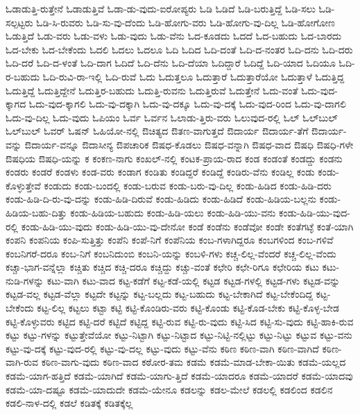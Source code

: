 {ಓಡಾಡುತ್ತಿ-ರುತ್ತೇನೆ
ಓಡಾಡುತ್ತಿವೆ
ಓಡಾ-ಡು-ವುದು-ಐರೋಪ್ಯರು
ಓಡಿ
ಓಡಿದೆ
ಓಡಿ-ಬರುತ್ತಿದ್ದೆ
ಓಡಿ-ಸಲು
ಓಡಿ-ಸಲ್ಪಟ್ಟರು
ಓಡಿ-ಸಿ-ರುವರು
ಓಡಿ-ಸು-ವು-ದೆಂದು
ಓಡಿ-ಹೋಗು-ವರು
ಓಡಿ-ಹೋಗು-ವು-ದಿಲ್ಲ
ಓಡಿ-ಹೋಗೋಣ
ಓಡುತ್ತಿದೆ
ಓಡು-ವರು
ಓಡು-ವಳು
ಓಡು-ವುದು
ಓಡು-ವೆನು
ಓದ-ಕೂಡದು
ಓದದೆ
ಓದ-ಬಹುದು
ಓದ-ಬಾರದು
ಓದ-ಬೇಕು
ಓದ-ಬೇಕೆಂದು
ಓದಲಿ
ಓದಲು
ಓದಲೂ
ಓದಿ
ಓದಿದ
ಓದಿ-ದಂತೆ
ಓದಿ-ದ-ನಂತರ
ಓದಿ-ದನು
ಓದಿ-ದರು
ಓದಿ-ದರೆ
ಓದಿ-ದ-ಳಂತೆ
ಓದಿ-ದಾಗ
ಓದಿದೆ
ಓದಿ-ದೆನು
ಓದಿ-ದೆಯಾ
ಓದಿದ್ದಾರೆ
ಓದಿದ್ದೆ
ಓದಿ-ಯಾದ
ಓದಿಯೂ
ಓದಿ-ರ-ಬಹುದು
ಓದಿ-ರುವಿ-ರಾ-ಇಲ್ಲಿ
ಓದಿ-ರುವೆ
ಓದು
ಓದುತ್ತಲೂ
ಓದುತ್ತಾರೆ
ಓದುತ್ತಾರೆಯೋ
ಓದುತ್ತಾಳೆ
ಓದುತ್ತಿದ್ದ
ಓದುತ್ತಿದ್ದೆ
ಓದುತ್ತಿದ್ದೇನೆ
ಓದುತ್ತಿರ-ಬಹುದು
ಓದುತ್ತಿ-ರುವನು
ಓದುತ್ತಿರುವೆ
ಓದುತ್ತೇನೆ
ಓದು-ವಂತೆ
ಓದು-ವುದ-ಕ್ಕಾಗದ
ಓದು-ವುದ-ಕ್ಕಾಗಲಿ
ಓದು-ವು-ದಕ್ಕಾಗಿ
ಓದು-ವು-ದಕ್ಕೂ
ಓದು-ವು-ದಕ್ಕೆ
ಓದು-ವುದ-ರಿಂದ
ಓದು-ವು-ದಾಗಲಿ
ಓದು-ವು-ದಿಲ್ಲ
ಓದು-ವುದು
ಓಪಿಯಂ
ಓರ್ವ
ಓರ್ವನ
ಓಲಾಡು-ತ್ತಿರು-ವರು
ಓಲುವುದ-ರಲ್ಲಿ
ಓಲ್
ಓಲ್‌ಬುಲ್
ಓಲ್‌ಬುಲ್‌
ಓವರ್
ಓಷನ್
ಓಹಿಯೋ-ನಲ್ಲಿ
ಔಚಿತ್ಯದ
ಔತಣ-ವಾಗುತ್ತದೆ
ಔದಾರ್ಯ
ಔದಾರ್ಯ-ತೆಗೆ
ಔದಾರ್ಯ-ವನ್ನು
ಔದಾರ್ಯ-ವನ್ನೂ
ಔದಾಸೀನ್ಯ
ಔಪಚಾರಿಕ
ಔಷಧ-ಕೊಡಲು
ಔಷಧ-ವನ್ನಾಗಿ
ಔಷಧ-ವಾದ
ಔಷಧಿ
ಔಷಧಿ-ಗಳೇ
ಔಷಧಿಯ
ಔಷಧಿ-ಯನ್ನು
ಕ
ಕಂಕಣ-ನಾಗು
ಕಂಖಲ್‌-ನಲ್ಲಿ
ಕಂಟಕ-ಪ್ರಾಯ-ರಾದ
ಕಂಡ
ಕಂಡಂತೆ
ಕಂಡದ್ದು
ಕಂಡನು
ಕಂಡರು
ಕಂಡರೆ
ಕಂಡಳು
ಕಂಡ-ವರು
ಕಂಡಾಗ
ಕಂಡಿತು
ಕಂಡಿದ್ದರೆ
ಕಂಡಿದ್ದೆ
ಕಂಡಿರು-ವೆನು
ಕಂಡಿಲ್ಲ
ಕಂಡು
ಕಂಡು-ಕೊಳ್ಳುತ್ತೇವೆ
ಕಂಡುದು
ಕಂಡು-ಬಂದಲ್ಲಿ
ಕಂಡು-ಬರುವ
ಕಂಡು-ಬರು-ವು-ದಿಲ್ಲ
ಕಂಡು-ಹಿಡಿದ
ಕಂಡು-ಹಿಡಿ-ದರು
ಕಂಡು-ಹಿಡಿ-ದಿ-ರು-ವು-ದನ್ನು
ಕಂಡು-ಹಿಡಿ-ದಿರುವೆ
ಕಂಡು-ಹಿಡಿದು
ಕಂಡು-ಹಿಡಿದೆ
ಕಂಡು-ಹಿಡಿಯ-ಬಲ್ಲನು
ಕಂಡು-ಹಿಡಿಯ-ಬಹು-ದಿತ್ತು
ಕಂಡು-ಹಿಡಿಯ-ಬಹುದು
ಕಂಡು-ಹಿಡಿ-ಯಲು
ಕಂಡು-ಹಿಡಿ-ಯು-ವನು
ಕಂಡು-ಹಿಡಿ-ಯು-ವುದ-ರಲ್ಲಿ
ಕಂಡು-ಹಿಡಿ-ಯು-ವುದು
ಕಂಡು-ಹಿಡಿ-ಯು-ವು-ದೇನೋ
ಕಂಡೆ
ಕಂಡೆನು
ಕಂಡೆವೋ
ಕಂಡೇ
ಕಂತೆಗಟ್ಳೆ
ಕಂತೆ-ಯಾಗಿ
ಕಂಪನಿ
ಕಂಪನಿಯ
ಕಂಪಿ-ಸುತ್ತಿತ್ತು
ಕಂಪೆನಿ
ಕಂಪೆ-ನಿಗೆ
ಕಂಪೆನಿಯ
ಕಂಬ-ಗಳಾಗಿದ್ದರೂ
ಕಂಬಗಳಿಂದ
ಕಂಬ-ಗಳಿವೆ
ಕಂಬನಿಗರೆ-ದರೂ
ಕಂಬ-ನಿಗೆ
ಕಂಬನಿದುಂಬಿ
ಕಂಬನಿ-ಯನ್ನು
ಕಂಬಳಿ-ಗಳು
ಕಚ್ಚ-ಲಿಲ್ಲ-ವೆಂದರೆ
ಕಚ್ಚ-ಲಿಲ್ಲ-ವೆಂದು
ಕಚ್ಚಾ-ಭಾಗ-ವನ್ನೆಲ್ಲಾ
ಕಚ್ಚಿತು
ಕಚ್ಚಿದ
ಕಚ್ಚಿ-ದರೂ
ಕಚ್ಚಿದ್ದು
ಕಚ್ಚು-ವಂತೆ
ಕಛೇರಿ
ಕಛೇ-ರಿಗೂ
ಕಛೇರಿಯ
ಕಟು
ಕಟು-ನುಡಿ-ಗಳನ್ನು
ಕಟು-ವಾಗಿ
ಕಟು-ವಾದ
ಕಟ್ಟ-ಕಡೆಗೆ
ಕಟ್ಟ-ಕಡೆ-ಯಲ್ಲಿ
ಕಟ್ಟಡ
ಕಟ್ಟಡ-ಗಳಲ್ಲಿ
ಕಟ್ಟಡ-ಗಳು
ಕಟ್ಟಡ-ವನ್ನು
ಕಟ್ಟಡ-ವಲ್ಲ
ಕಟ್ಟಡ-ವೆಲ್ಲಾ
ಕಟ್ಟದೇ
ಕಟ್ಟನ್ನು
ಕಟ್ಟ-ಬಲ್ಲದು
ಕಟ್ಟ-ಬಹುದು
ಕಟ್ಟ-ಬೇಕಾಗಿದೆ
ಕಟ್ಟ-ಬೇಕೆಂದಿದ್ದ
ಕಟ್ಟ-ಬೇಕೆಂದು
ಕಟ್ಟ-ಲಿಲ್ಲ
ಕಟ್ಟಲು
ಕಟ್ಟಾ
ಕಟ್ಟಿ
ಕಟ್ಟಿ-ಕೊಂಡಿರು-ವರು
ಕಟ್ಟಿ-ಕೊಂಡು
ಕಟ್ಟಿ-ಕೊಡ-ಬೇಕು
ಕಟ್ಟಿ-ಕೊಳ್ಳ-ಬೇಡ
ಕಟ್ಟಿ-ಕೊಳ್ಳುವರು
ಕಟ್ಟಿದ
ಕಟ್ಟಿ-ದರೆ
ಕಟ್ಟಿದೆ
ಕಟ್ಟಿದ್ದ
ಕಟ್ಟಿ-ರುವ
ಕಟ್ಟಿ-ರು-ವುದು
ಕಟ್ಟಿ-ಸಿದ
ಕಟ್ಟಿ-ಸು-ವುದು
ಕಟ್ಟಿ-ಹಾಕಿ-ರುವ
ಕಟ್ಟು
ಕಟ್ಟು-ಗಳನ್ನು
ಕಟ್ಟುತ್ತೇವೆಯೋ
ಕಟ್ಟು-ನಿಟ್ಟಾಗಿ
ಕಟ್ಟು-ನಿಟ್ಟಾದ
ಕಟ್ಟು-ನಿಟ್ಟಿ-ನಲ್ಲಿಟ್ಟು
ಕಟ್ಟು-ನಿಟ್ಟು
ಕಟ್ಟುವ
ಕಟ್ಟು-ವನು
ಕಟ್ಟು-ವು-ದಕ್ಕೆ
ಕಟ್ಟು-ವುದ-ರಲ್ಲಿ
ಕಟ್ಟು-ವು-ದಲ್ಲ
ಕಟ್ಟು-ವುದು
ಕಟ್ಟು-ವೆನು
ಕಠಿಣ
ಕಠಿಣ-ವಾಗಿ
ಕಠಿಣ-ವಾಗಿದೆ
ಕಠಿಣ-ವಾಗಿ-ರುವ
ಕಠಿಣ-ವಾಗು-ವುದು
ಕಠಿಣ-ವಾದ
ಕಠೋರ-ತಮ
ಕಡಮೆ
ಕಡಮೆ-ಮಾಡ-ಬೇಕಾ-ಯಿತು
ಕಡಮೆ-ಯಲ್ಲದ
ಕಡಮೆ-ಯಾಗ-ಹತ್ತಿದೆ
ಕಡಮೆ-ಯಾಗಿದೆ
ಕಡಮೆ-ಯಾಗು-ತ್ತಿದೆ
ಕಡಮೆ-ಯಾದರೂ
ಕಡಮೆ-ಯಾದರೆ
ಕಡಮೆ-ಯಾದವು
ಕಡಮೆ-ಯಾ-ದಷ್ಟೂ
ಕಡಮೆ-ಯಾದುದೇ
ಕಡಮೆ-ಯೇನೂ
ಕಡಲನ್ನು
ಕಡಲ-ಮೇಲೆ
ಕಡಲಲ್ಲಿ
ಕಡಲಿಂದ
ಕಡಲಿನ
ಕಡಲಿ-ನಾಳ-ದಲ್ಲಿ
ಕಡಲೆ
ಕಡಿತಕ್ಕೆ
ಕಡಿತಕ್ಕೆಲ್ಲ
}
